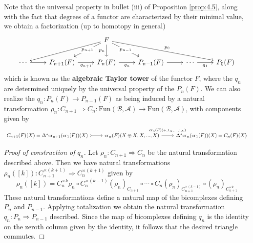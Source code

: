 Note that the universal property in bullet (iii) of Proposition \ref{prop:4.5}, along with the fact that degrees of a functor are characterized by their minimal value, we obtain a factorization (up to homotopy in general)
\[\begin{tikzcd}
	&& F \\
	\cdots & {P_{n+1}(F)} & {P_n(F)} & {P_{n-1}(F)} & \cdots & {P_0(F)}
	\arrow["{p_0}", from=1-3, to=2-6]
	\arrow["{q_1}"', from=2-5, to=2-6]
	\arrow["{p_n}"', from=1-3, to=2-3]
	\arrow["{p_{n-1}}"{description}, from=1-3, to=2-4]
	\arrow[from=2-4, to=2-5]
	\arrow["{q_n}"', from=2-3, to=2-4]
	\arrow["{p_{n+1}}"{description}, from=1-3, to=2-2]
	\arrow["{q_{n+1}}"', from=2-2, to=2-3]
	\arrow[from=1-3, to=2-1]
	\arrow[from=2-1, to=2-2]
\end{tikzcd}\]
which is known as the \textbf{algebraic Taylor tower} of the functor $F$, where the $q_n$ are determined uniquely by the universal property of the $P_n(F)$. We can also realize the $q_n:P_n(F)\rightarrow P_{n-1}(F)$ as being induced by a natural transformation $\rho_n:C_{n+1}\Rightarrow C_n:\text{Fun}(\mathcal{B},\mathcal{A})\rightarrow \text{Fun}(\mathcal{B},\mathcal{A})$, with components given by
\[\begin{tikzcd}
	{C_{n+1}(F)(X)=\Delta^*\text{cr}_{n+1}(\text{cr}_1(F))(X)} & {\text{cr}_n(F)(X\oplus X,X,...,X)} & {\Delta^*\text{cr}_n(\text{cr}_1(F))(X)=C_n(F)(X)}
	\arrow[tail, from=1-1, to=1-2]
	\arrow["{\text{cr}_n(F)(+,1_X,...,1_X)}", outer sep = 5pt, from=1-2, to=1-3]
\end{tikzcd}\]
\begin{proof}[Proof of construction of $q_n$]
    Let $\rho_n:C_{n+1}\Rightarrow C_n$ be the natural transformation described above. Then we have natural transformations $\rho_n([k]):C_{n+1}^{\times (k+1)}\Rightarrow C_n^{\times (k+1)}$ given by
    \begin{equation*}
        \rho_n([k]) = C_n^{\times k}\rho_n \circ C_n^{\times (k-1)}(\rho_n)_{C_{n+1}}\circ \cdots \circ C_n(\rho_n)_{C_{n+1}^{\times (k-1)}}\circ(\rho_n)_{C_{n+1}^{\times k}}
    \end{equation*}
    These natural transformations define a natural map of the bicomplexes defining $P_n$ and $P_{n-1}$. Applying totalization we obtain the natural transformation $q_n:P_n\Rightarrow P_{n-1}$ described. Since the map of bicomplexes defining $q_n$ is the identity on the zeroth column given by the identity, it follows that the desired triangle commutes.
\end{proof}


